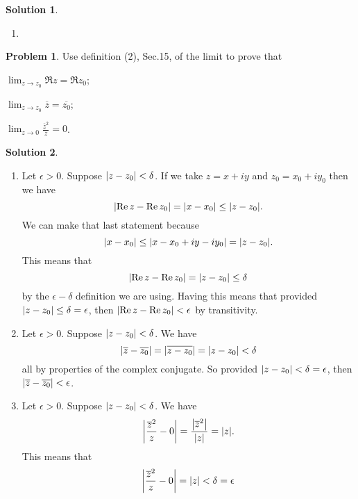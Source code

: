 \documentclass[10pt]{article}
\theoremstyle{definition}
\newtheorem{problem}{Problem}
\newtheorem{soln}{Solution}
\begin{document}
\begin{soln}
\begin{enumerate}[label=(\alph*)]
\begin{center}
\begin{tikzpicture}[scale=2]
            \end{tikzpicture}
          \end{center}
    \item ~\begin{center}
          \end{center}
  \end{enumerate}
\end{soln}
\newpage

\begin{problem}
Use definition (2), Sec.15, of the limit to prove that
\begin{center}
  \begin{enumerate*}[label=(\alph*)]
    \item $\lim_{z\to z_0}\Re z = \Re z_0$;\qquad~
    \item $\lim_{z\to z_0}\overline{z}=\overline{z_0}$;\qquad~
    \item $\lim_{z\to 0}\frac{\overline{z}^2}{z}=0$.
  \end{enumerate*}
\end{center}
\end{problem}
\begin{soln}~
  \begin{enumerate}[label=(\alph*)]
    \item Let $\epsilon>0$. Suppose $\abs{z-z_0}<\delta$. If we take $z=x+iy$ and $z_0=x_0+iy_0$ then we have
          $$\abs{\Re z-\Re z_0}=\abs{x-x_0}\leq \abs{z-z_0}.$$
          We can make that last statement because
          $$\abs{x-x_0}\leq \abs{x-x_0+iy-iy_0}=\abs{z-z_0}.$$
          This means that
          $$\abs{\Re z-\Re z_0}=\abs{z-z_0}\leq \delta$$
          by the $\epsilon-\delta$ definition we are using. Having this means that provided
          $\abs{z-z_0}\leq \delta=\epsilon$, then $\abs{\Re z-\Re z_0}<\epsilon$ by transitivity.
    \item Let $\epsilon>0$. Suppose $\abs{z-z_0}<\delta$. We have
          $$\abs{\overline{z}-\overline{z_0}}=\abs{\overline{z-z_0}}=\abs{z-z_0}<\delta$$
          all by properties of the complex conjugate. So provided $\abs{z-z_0}<\delta=\epsilon$, then
          $\abs{\overline{z}-\overline{z_0}}<\epsilon$.
    \item Let $\epsilon>0$. Suppose $\abs{z-z_0}<\delta$. We have
          $$\abs{\frac{\overline{z}^2}{z}-0}=\frac{\abs{\overline{z}^2}}{\abs{z}}=\abs{z}.$$
          This means that $$\abs{\frac{\overline{z}^2}{z}-0}=\abs{z}< \delta=\epsilon$$
  \end{enumerate}
\end{soln}
\end{document}

